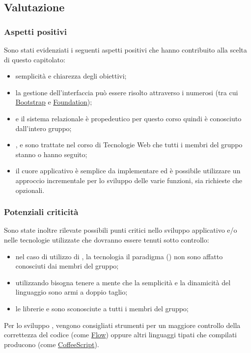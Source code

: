 \documentclass[12pt,a4paper]{article}
\begin{document}
\subsection{Valutazione}
\subsubsection{Aspetti positivi}

Sono stati evidenziati i seguenti aspetti positivi che hanno contribuito alla scelta di questo capitolato:

\begin{itemize}
\item semplicità e chiarezza degli obiettivi;
\item la gestione dell'interfaccia  può essere risolto attraverso i numerosi  (tra cui \href{http://getbootstrap.com}{Bootstrap} e \href{http://foundation.zurb.com}{Foundation});
\item {} e il sistema relazionale è propedeutico per questo corso quindi è conosciuto dall'intero gruppo;
\item {},  e  sono trattate nel corso di Tecnologie Web che tutti i membri del gruppo stanno o hanno
seguito;
\item il cuore applicativo è semplice da implementare ed è possibile utilizzare un approccio incrementale per lo sviluppo delle varie funzioni, sia richieste che opzionali.
\end{itemize}

\subsubsection{Potenziali criticità}

Sono state inoltre rilevate possibili punti critici nello sviluppo applicativo e/o nelle tecnologie utilizzate che dovranno essere tenuti sotto controllo:

\begin{itemize}
\item nel caso di utilizzo di , la tecnologia il paradigma () non sono affatto conosciuti dai membri del gruppo;
\item utilizzando  bisogna tenere a mente che la semplicità e la dinamicità del linguaggio sono armi a doppio taglio;
\item le librerie  e  sono sconosciute a tutti i membri del gruppo;
\end{itemize}
Per lo sviluppo , vengono consigliati strumenti per un maggiore controllo della correttezza del codice (come \href{http://flowtype.org}{Flow}) oppure altri linguaggi tipati che compilati producono  (come \href{http://coffeescript.org}{CoffeeScript}).
\end{document}
